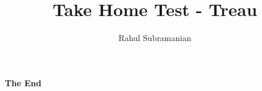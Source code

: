 \documentclass[11pt, oneside]{article}   	%
\title{\textbf{Take Home Test - Treau}}
\author{Rahul Subramanian}
\begin{document}
\maketitle

\newpage







\newpage
\vspace*{\fill}
\begin{center}
\textbf{The End}
 \end{center}
 \vspace*{\fill}
\end{document}
